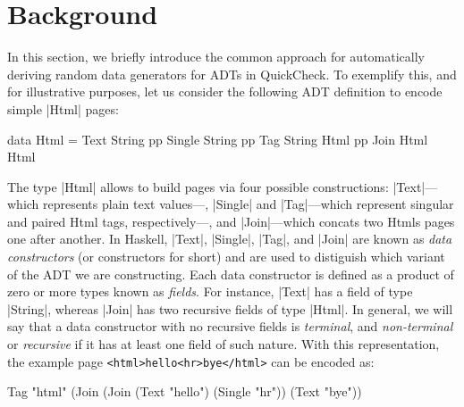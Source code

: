 \section{Background} \label{sec:randomtesting}

In this section, we briefly introduce the common approach for automatically
deriving random data generators for ADTs in QuickCheck.
%
%
%
To exemplify this, and for illustrative purposes, let us consider the following
ADT definition to encode simple |Html| pages:
%
\begin{code}
data Html  =   Text    String
           pp  Single  String
           pp  Tag     String  Html
           pp  Join    Html    Html

\end{code}
%
The type |Html| allows to build pages via four possible constructions:
|Text|---which represents plain text values---, |Single| and |Tag|---which
represent singular and paired Html tags, respectively---, and |Join|---which
concats two Htmls pages one after another.
%
In Haskell, |Text|, |Single|, |Tag|, and |Join| are known as \emph{data
  constructors} (or constructors for short) and are used to distiguish which
variant of the ADT we are constructing.
%
Each data constructor is defined as a product of zero or more types known as
\emph{fields}.
%
For instance, |Text| has a field of type |String|, whereas |Join| has two
recursive fields of type |Html|.
%
In general, we will say that a data constructor with no recursive fields is
\emph{terminal}, and \emph{non-terminal} or \emph{recursive} if it has at least
one field of such nature.
%
With this representation, the example page \texttt{<html>hello<hr>bye</html>}
can be encoded as:
%
\begin{code}
Tag "html" (Join (Join
  (Text "hello") (Single "hr")) (Text "bye"))
\end{code}
%

